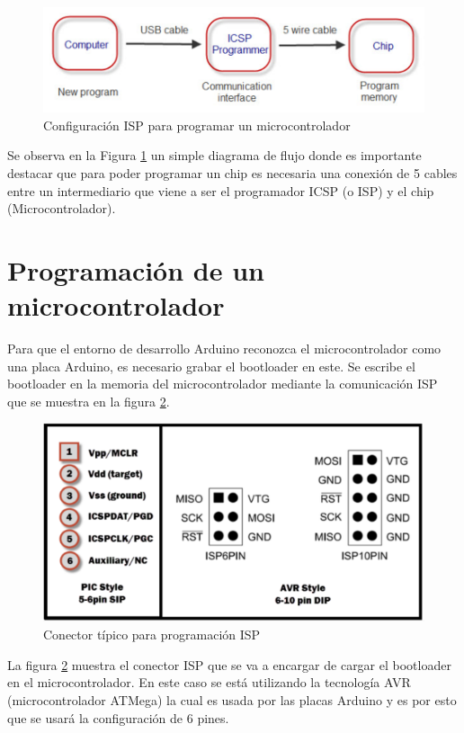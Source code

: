 \begin{figure}[H]
\centering
\includegraphics[scale=0.5]{figuras/firmware/isp.png}
\caption{Configuración ISP para programar un microcontrolador}
\label{isp}
\end{figure}

Se observa en la Figura \ref{isp} un simple diagrama de flujo donde es importante destacar que para poder programar un chip es necesaria una conexión de 5 cables entre un intermediario que viene a ser el programador ICSP (o ISP) y el chip (Microcontrolador).

\newpage
\section{Programación de un microcontrolador}
Para que el entorno de desarrollo Arduino reconozca el microcontrolador como una placa Arduino, es necesario grabar el bootloader en este. Se escribe el bootloader en la memoria del microcontrolador mediante la comunicación ISP que se muestra en la figura \ref{pin}.

\begin{figure}[H]
\centering
\includegraphics[scale=0.5]{figuras/firmware/pin.png}
\caption{Conector típico para programación ISP}
\label{pin}
\end{figure}

La figura \ref{pin} muestra el conector ISP que se va a encargar de cargar el bootloader en el microcontrolador.  En este caso se está utilizando la tecnología AVR (microcontrolador ATMega) la cual es usada por las placas Arduino y es por esto que se usará la configuración de 6 pines. 

